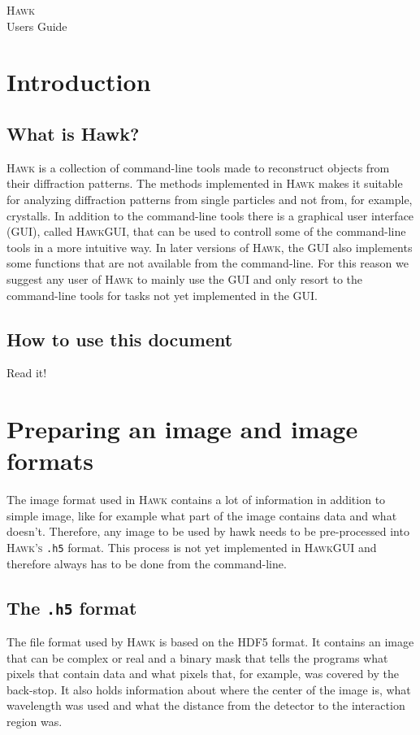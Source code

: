 \documentclass[11pt,a4paper]{article}
\newcommand{\hawk}[1]{\textsc{#1}}
\newcommand{\program}[1]{\textsc{#1}}
\newcommand{\com}[1]{\texttt{#1}}
\begin{document}
\begin{center}
  {\Huge \hawk{Hawk}}\\\vspace{0.3cm}
  {\Large Users Guide}\\\vspace{1cm}
\end{center}
\tableofcontents
\section{Introduction}
\subsection{What is Hawk?}
\hawk{Hawk} is a collection of command-line tools made to reconstruct objects from their diffraction patterns. The methods implemented in \hawk{Hawk} makes it suitable for analyzing diffraction patterns from single particles and not from, for example, crystalls. In addition to the command-line tools there is a graphical user interface (GUI), called \hawk{HawkGUI}, that can be used to controll some of the command-line tools in a more intuitive way. In later versions of \hawk{Hawk}, the GUI also implements some functions that are not available from the command-line. For this reason we suggest any user of \hawk{Hawk} to mainly use the GUI and only resort to the command-line tools for tasks not yet implemented in the GUI.

\subsection{How to use this document}
Read it!

\section{Preparing an image and image formats}
The image format used in \hawk{Hawk} contains a lot of information in addition to simple image, like for example what part of the image contains data and what doesn't. Therefore, any image to be used by hawk needs to be pre-processed into \hawk{Hawk's} \com{.h5} format. This process is not yet implemented in \hawk{HawkGUI} and therefore always has to be done from the command-line.

\subsection{The \com{.h5} format}
The file format used by \hawk{Hawk} is based on the \program{HDF5} format. It contains an image that can be complex or real and a binary mask that tells the programs what pixels that contain data and what pixels that, for example, was covered by the back-stop. It also holds information about where the center of the image is, what wavelength was used and what the distance from the detector to the interaction region was.
\end{document}

